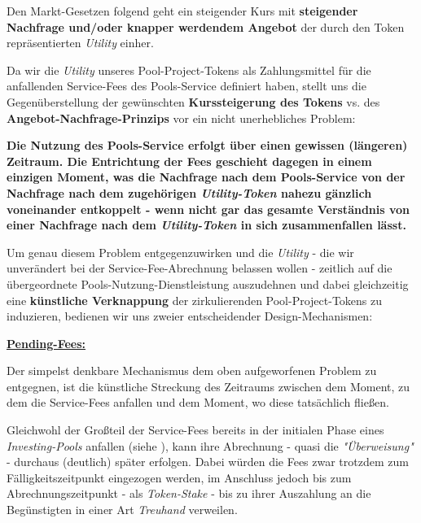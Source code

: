 \begin{Konzept}
\vspace{0.2cm}

Den Markt-Gesetzen folgend geht ein steigender Kurs mit \textbf{steigender Nachfrage und/oder knapper werdendem Angebot} der durch den Token repräsentierten \textit{Utility} einher.

\vspace{0.2cm}

Da wir die \textit{Utility} unseres Pool-Project-Tokens als Zahlungsmittel für die anfallenden Service-Fees des Pools-Service definiert haben, stellt uns die Gegenüberstellung der gewünschten \textbf{Kurssteigerung des Tokens} vs. des \textbf{Angebot-Nachfrage-Prinzips} vor ein nicht unerhebliches Problem:

\vspace{0.4cm}

\textbf{Die Nutzung des Pools-Service erfolgt über einen gewissen (längeren) Zeitraum. Die Entrichtung der Fees geschieht dagegen in einem einzigen Moment, was die Nachfrage nach dem Pools-Service von der Nachfrage nach dem zugehörigen \textit{Utility-Token} nahezu gänzlich voneinander ent\-koppelt - wenn nicht gar das gesamte Verständnis von einer Nachfrage nach dem \textit{Utility-Token} in sich zusammenfallen lässt.} 

\vspace{0.4cm}

Um genau diesem Problem entgegenzuwirken und die \textit{Utility} - die wir unverändert bei der Service-Fee-Abrechnung belassen wollen - zeitlich auf die übergeordnete Pools-Nutzung-Dienstleistung auszudehnen und dabei gleichzeitig eine \textbf{künstliche Verknappung} der zirkulierenden Pool-Project-Tokens zu induzieren, bedienen wir uns zweier entscheidender Design-Mechanismen:

\vspace{0.5cm}

\underline{\textbf{Pending-Fees:}}
\vspace{0.3cm}

Der simpelst denkbare Mechanismus dem oben aufgeworfenen Problem zu entgegnen, ist die künstliche Streckung des Zeitraums zwischen dem Moment, zu dem die Service-Fees anfallen und dem Moment, wo diese tatsächlich fließen.

\vspace{0.2cm}

Gleichwohl der Großteil der Service-Fees bereits in der initialen Phase eines \\ \textit{Investing-Pools} anfallen (siehe ), kann ihre Abrechnung - quasi die \textit{"Überweisung"} - durchaus (deutlich) später erfolgen. Dabei würden die Fees zwar trotzdem zum Fälligkeitszeitpunkt eingezogen werden, im Anschluss jedoch bis zum Abrechnungszeitpunkt - als \textit{Token-Stake} - bis zu ihrer Auszahlung an die Begünstigten in einer Art \textit{Treuhand} verweilen.


\end{Konzept}
